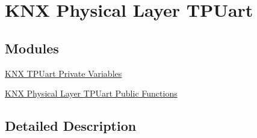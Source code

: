 \hypertarget{group___k_n_x___p_h___t_p_u_a_r_t}{}\section{K\+NX Physical Layer T\+P\+Uart}
\label{group___k_n_x___p_h___t_p_u_a_r_t}
\subsection*{Modules}
\begin{DoxyCompactItemize}
\item 
\hyperlink{group___k_n_x___p_h___t_p_u_a_r_t___private___variables}{K\+N\+X T\+P\+Uart Private Variables}
\item 
\hyperlink{group___k_n_x___p_h___t_p_u_a_r_t___public___functions}{K\+N\+X Physical Layer T\+P\+Uart Public Functions}
\end{DoxyCompactItemize}


\subsection{Detailed Description}
